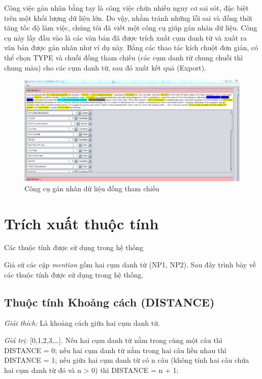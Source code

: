\documentclass[12pt]{report}
\begin{document}
			\par Công việc gán nhãn bằng tay là công việc chứa nhiều nguy cơ sai sót, đặc biệt trên một khối lượng dữ liệu lớn. Do vậy, nhằm tránh những lỗi sai và đồng thời tăng tốc độ làm việc, chúng tôi đã viết một công cụ giúp gán nhãn dữ liệu. Công cụ này lấy đầu vào là các văn bản đã được trích xuất cụm danh từ và xuất ra văn bản được gán nhãn như ví dụ này. Bằng các thao tác kích chuột đơn giản, có thể chọn TYPE và chuỗi đồng tham chiếu (các cụm danh từ chung chuỗi thì chung màu) cho các cụm danh từ, sau đó xuất kết quả (Export).
			\begin{figure}[H] 
				\centering				
				\includegraphics[width=\textwidth,height=\textheight,keepaspectratio]{images/markup_tool.png}		\caption{Công cụ gán nhãn dữ liệu đồng tham chiếu}	
			\end{figure}

		\section{Trích xuất thuộc tính}

			\begin{table}[H]
				\centering
				
				\caption{Các thuộc tính được sử dụng trong hệ thống}
				\label{features_table}
			\end{table}

			\par Giả sử các cặp \textit{mention} gồm hai cụm danh từ (NP1, NP2). Sau đây trình bày về các thuộc tính được sử dụng trong hệ thống.

			\subsection*{Thuộc tính Khoảng cách (DISTANCE)}
				\par \textit{Giải thích:} Là khoảng cách giữa hai cụm danh từ.
				\par \textit{Giá trị:} [0,1,2,3,…]. Nếu hai cụm danh từ nằm trong cùng một câu thì DISTANCE = 0; nếu hai cụm danh từ nằm trong hai câu liền nhau thì DISTANCE = 1; nếu giữa hai cụm danh từ có n câu (không tính hai câu chứa hai cụm danh từ đó và n > 0) thì DISTANCE = n + 1;
 
\end{document}
